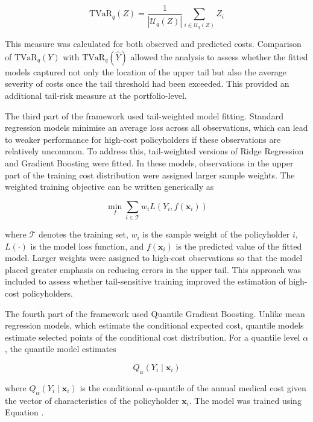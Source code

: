 	\begin{equation}
		\mathrm{TVaR}_q(Z)
		=
		\frac{1}{|\mathcal{U}_q(Z)|}
		\sum_{i \in \mathcal{U}_q(Z)}
		Z_i
	\end{equation}

	This measure was calculated for both observed and predicted costs. Comparison of \(\mathrm{TVaR}_q(Y)\) with \(\mathrm{TVaR}_q(\hat{Y})\) allowed the analysis to assess whether the fitted models captured not only the location of the upper tail but also the average severity of costs once the tail threshold had been exceeded. This provided an additional tail-risk measure at the portfolio-level.
	
	The third part of the framework used tail-weighted model fitting. Standard regression models minimise an average loss across all observations, which can lead to weaker performance for high-cost policyholders if these observations are relatively uncommon. To address this, tail-weighted versions of Ridge Regression and Gradient Boosting were fitted. In these models, observations in the upper part of the training cost distribution were assigned larger sample weights. The weighted training objective can be written generically as
	
	\begin{equation}
		\min_f
		\sum_{i \in \mathcal{T}}
		w_i L(Y_i, f(\mathbf{x}_i))
	\end{equation}
	
	where \(\mathcal{T}\) denotes the training set, \(w_i\) is the sample weight of the policyholder \(i\), \(L(\cdot)\) is the model loss function, and \(f(\mathbf{x}_i)\) is the predicted value of the fitted model. Larger weights were assigned to high-cost observations so that the model placed greater emphasis on reducing errors in the upper tail. This approach was included to assess whether tail-sensitive training improved the estimation of high-cost policyholders.
	
	The fourth part of the framework used Quantile Gradient Boosting. Unlike mean regression models, which estimate the conditional expected cost, quantile models estimate selected points of the conditional cost distribution. For a quantile level \(\alpha\), the quantile model estimates
	
	\begin{equation}
		Q_{\alpha}(Y_i \mid \mathbf{x}_i)
	\end{equation}
	
	where \(Q_{\alpha}(Y_i \mid \mathbf{x}_i)\) is the conditional \(\alpha\)-quantile of the annual medical cost given the vector of characteristics of the policyholder \(\mathbf{x}_i\). The model was trained using Equation .
	
